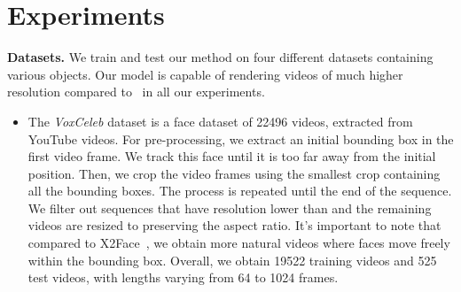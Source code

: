 \documentclass{article}
\begin{document}
 \vspace{-0.2cm}





 



\section{Experiments}
\vspace{-0.2cm}
\label{Experiments}
\noindent
\textbf{Datasets.} 
We train and test our method on four different datasets containing various objects. Our model is capable of rendering videos of much higher resolution compared to~\cite{siarohin2018animating} in all our experiments. 
\begin{itemize}[noitemsep,topsep=0pt,wide=0pt]
\item The \emph{VoxCeleb} dataset \cite{Nagrani17} is a face dataset of 22496 videos, extracted from YouTube videos. For pre-processing, we extract an initial bounding box in the first video frame. We track this face until it is too far away from the initial position. Then, we crop the video frames using the smallest crop containing all the bounding boxes. The process is repeated until the end of the sequence. We filter out sequences that have resolution lower than  and the remaining videos are resized to  preserving the aspect ratio. It's important to note that compared to X2Face~\cite{wiles2018x2face}, we obtain more natural videos where faces move freely within the bounding box. Overall, we obtain 19522 training videos and 525 test videos, with lengths varying from 64 to 1024 frames.

\begin{figure}[t]
\begin{minipage}{\textwidth}
 \begin{minipage}[t]{.45\linewidth}
  \centering
\centering
    \vspace{-2.5cm}
\end{minipage}
\end{minipage}
\end{figure}
\end{itemize}
\end{document}
